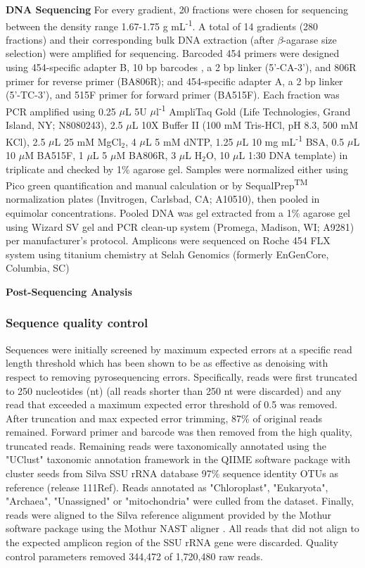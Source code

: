 \textbf{DNA Sequencing}  For every gradient, 20 fractions were chosen for sequencing between the density range 1.67-1.75 g mL\textsuperscript{-1}. A total of 14 gradients (280 fractions) and their corresponding bulk DNA extraction (after $\beta$-agarase size selection) were amplified for sequencing. Barcoded 454 primers were designed using 454-specific adapter B, 10 bp barcodes \cite{Hamady_2008}, a 2 bp linker (5'-CA-3'), and 806R primer for reverse primer (BA806R); and 454-specific adapter A, a 2 bp linker (5'-TC-3'), and 515F primer for forward primer (BA515F). Each fraction was PCR amplified using 0.25 $\mu$L 5U $\mu$l\textsuperscript{-1} AmpliTaq Gold (Life Technologies, Grand Island, NY; N8080243), 2.5 $\mu$L 10X Buffer II (100 mM Tris-HCl, pH 8.3, 500 mM KCl), 2.5 $\mu$L 25 mM MgCl$_{2}$, 4 $\mu$L 5 mM dNTP, 1.25 $\mu$L 10 mg mL\textsuperscript{-1} BSA, 0.5 $\mu$L 10 $\mu$M BA515F, 1 $\mu$L 5 $\mu$M BA806R, 3 $\mu$L H$_{2}$O, 10 $\mu$L 1:30 DNA template) in triplicate and checked by 1\% agarose gel. Samples were normalized either using Pico green quantification and manual calculation or by SequalPrep\textsuperscript{TM} normalization plates (Invitrogen, Carlsbad, CA; A10510), then pooled in equimolar concentrations. Pooled DNA was gel extracted from a 1\% agarose gel using Wizard SV gel and PCR clean-up system (Promega, Madison, WI; A9281) per manufacturer's protocol.  Amplicons were sequenced on Roche 454 FLX system using titanium chemistry at Selah Genomics (formerly EnGenCore, Columbia, SC)    

\textbf{Post-Sequencing Analysis}
\subsubsection{Sequence quality control}
Sequences were initially screened by maximum expected errors at a specific read
length threshold \citep{Edgar_2013} which has been shown to be as effective as
denoising with respect to removing pyrosequencing errors. Specifically, reads
were first truncated to 250 nucleotides (nt) (all reads shorter than 250 nt
were discarded) and any read that exceeded a maximum expected error threshold
of 0.5 was removed. After truncation and max expected error trimming, 87\% of
original reads remained. Forward primer and barcode was then removed from the
high quality, truncated reads.  Remaining reads were taxonomically annotated
using the "UClust" taxonomic annotation framework in the QIIME software package
\citep{Edgar_2010,Caporaso_2010} with cluster seeds from Silva SSU rRNA database
\citep{Pruesse_2007} 97\% sequence identity OTUs as reference (release 111Ref).
Reads annotated as "Chloroplast", "Eukaryota", "Archaea", "Unassigned" or
"mitochondria" were culled from the dataset. Finally, reads were aligned to the
Silva reference alignment provided by the Mothur software package
\cite{Schloss_2009} using the Mothur NAST aligner \cite{DeSantis_2006}. All reads that
did not align to the expected amplicon region of the SSU rRNA gene were
discarded. Quality control parameters removed 344,472 of 1,720,480 raw reads.

